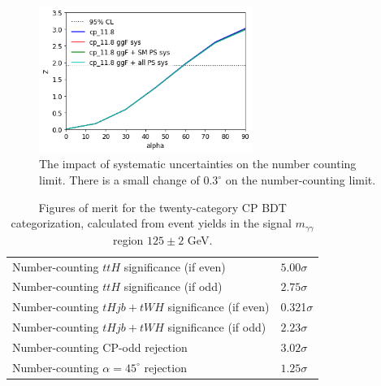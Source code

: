 \begin{figure}
  \centering
        \includegraphics[width=0.62\textwidth]{figures/tthcp_chapter/categorization_xgb/cp_11_syst.png}
  \caption{The impact of systematic uncertainties on the number counting limit. There is a small change of $0.3^\circ$ on the number-counting limit.}
  \label{fig:ncrej_syst}
\end{figure}


\begin{table}[ht]
\begin{center}
\begin{tabular}{ll}
Number-counting $ttH$ significance (if even)& $5.00\sigma$  \\
Number-counting $ttH$ significance (if odd)& $2.75\sigma$  \\
Number-counting $tHjb + tWH$ significance (if even)& 0.321$\sigma$  \\
Number-counting $tHjb+tWH$ significance (if odd)& $2.23\sigma$  \\ \hline
Number-counting CP-odd rejection & $3.02\sigma$ \\
Number-counting $\alpha=45^\circ$ rejection & $1.25\sigma$ \\ \hline
\hline
\end{tabular}
\end{center}
\vspace{-0.5cm}
\caption{Figures of merit for the twenty-category CP BDT categorization, calculated from event yields in the signal $m_{\gamma\gamma}$ region $125\pm2$ GeV.}
\label{tab:sigs}
\end{table}
